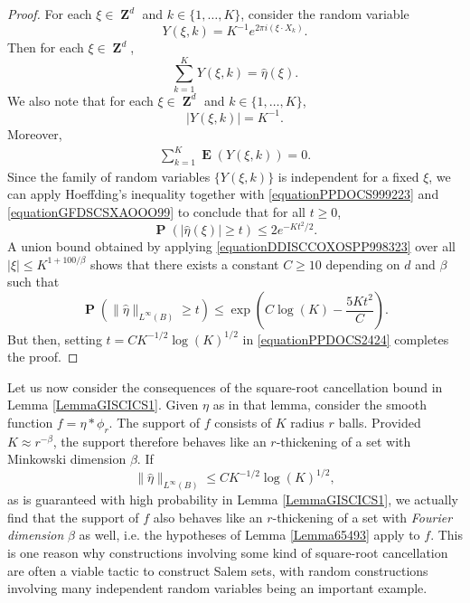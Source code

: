 \documentclass[dvipsnames,letterpaper,12pt]{article}
\numberwithin{equation}{section}
\DeclareMathOperator{\ZZ}{\mathbf{Z}}
\numberwithin{theorem}{section}
\DeclareMathOperator{\EE}{\mathbf{E}}
\DeclareMathOperator{\PP}{\mathbf{P}}
\begin{document}
\begin{proof}
    For each $\xi \in \ZZ^d$ and $k \in \{ 1, \dots, K \}$, consider the random variable
    \[ Y(\xi,k) = K^{-1} e^{2 \pi i (\xi \cdot X_k)}. \]    
    Then for each $\xi \in \ZZ^d$,
    \begin{equation} \label{equationPPDOCS999223}
        \sum_{k = 1}^K Y(\xi,k) = \widehat{\eta}(\xi).
    \end{equation}
    We also note that for each $\xi \in \ZZ^d$ and $k \in \{ 1, \dots, K \}$,
    \begin{equation} \label{equationGFDSCSXAOOO99}
        |Y(\xi,k)| = K^{-1}.
    \end{equation}
    Moreover,
    \begin{equation} \label{equationDOIJWIJCCCCC5555322}
    \begin{split}
        \sum_{k = 1}^K \EE(Y(\xi,k)) = 0.
    \end{split}
    \end{equation}
    Since the family of random variables $\{ Y(\xi,k) \}$ is independent for a fixed $\xi$, we can apply Hoeffding's inequality together with \eqref{equationPPDOCS999223} and \eqref{equationGFDSCSXAOOO99} to conclude that for all $t \geq 0$,
    \begin{equation} \label{equationDDISCCOXOSPP998323}
        \PP \left( |\widehat{\eta}(\xi)| \geq t \right) \leq 2 e^{-Kt^2/2}.
    \end{equation}
    A union bound obtained by applying \eqref{equationDDISCCOXOSPP998323} over all $|\xi| \leq K^{1 + 100/\beta}$ shows that there exists a constant $C \geq 10$ depending on $d$ and $\beta$ such that %
    \begin{equation} \label{equationPPDOCS2424}
        \PP \left( \| \widehat{\eta} \|_{L^\infty(B)} \geq t \right) \leq \exp \left( C \log(K) - \frac{5K t^2}{C} \right).
    \end{equation}
    But then, setting $t = CK^{-1/2} \log(K)^{1/2}$ in \eqref{equationPPDOCS2424} completes the proof.
\end{proof}

Let us now consider the consequences of the square-root cancellation bound in Lemma \ref{LemmaGISCICS1}. Given $\eta$ as in that lemma, consider the smooth function $f = \eta * \phi_r$. The support of $f$ consists of $K$ radius $r$ balls. Provided $K \approx r^{-\beta}$, the support therefore behaves like an $r$-thickening of a set with Minkowski dimension $\beta$. If
%
\begin{equation}
    \| \widehat{\eta} \|_{L^\infty(B)} \leq C K^{-1/2} \log(K)^{1/2},
\end{equation}
%
as is guaranteed with high probability in Lemma \ref{LemmaGISCICS1}, we actually find that the support of $f$ also behaves like an $r$-thickening of a set with \emph{Fourier dimension} $\beta$ as well, i.e. the hypotheses of Lemma \ref{Lemma65493} apply to $f$. This is one reason why constructions involving some kind of square-root cancellation are often a viable tactic to construct Salem sets, with random constructions involving many independent random variables being an important example.
\end{document}
